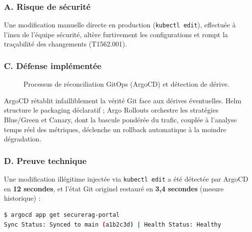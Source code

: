 \subsubsection{A. Risque de sécurité}
Une modification manuelle directe en production (\texttt{kubectl edit}), effectuée à l'insu de l'équipe sécurité, altère furtivement les configurations et rompt la traçabilité des changements (T1562.001).

\subsubsection{C. Défense implémentée}

\begin{figure}[H]
\centering
\scriptsize
{}
\caption{Processus de réconciliation GitOps (ArgoCD) et détection de dérive.}
\end{figure}

ArgoCD rétablit infailliblement la vérité Git face aux dérives éventuelles. Helm structure le packaging déclaratif ; Argo Rollouts orchestre les stratégies Blue/Green et Canary, dont la bascule pondérée du trafic, couplée à l'analyse temps réel des métriques, déclenche un rollback automatique à la moindre dégradation.

\subsubsection{D. Preuve technique}
Une modification illégitime injectée via \texttt{kubectl edit} a été détectée par ArgoCD en \textbf{12 secondes}, et l'état Git originel restauré en \textbf{3,4 secondes} (mesure historique) :
\begin{lstlisting}[language=bash, caption={Statut de synchronisation ArgoCD}, label={lst:argocd_proof_layer}]
$ argocd app get securerag-portal
Sync Status: Synced to main (a1b2c3d) | Health Status: Healthy
\end{lstlisting}

